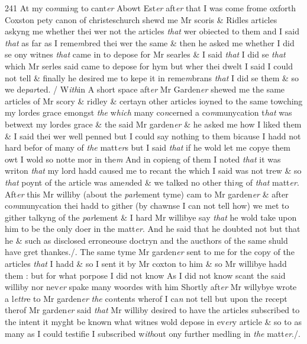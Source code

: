 \documentclass[12pt, a4paper]{book}
\begin{document}
{\color{Mahogany}241} At my co\textit{m}mi\textit{n}g to cant\textit{er}  Abowt Est\textit{er} aft\textit{er} that I was come frome oxforth Coxston pety canon of  christeschurch shewd me Mr scoris \& Ridles articles askyng me whether thei wer not the articles \textit{that} wer obiected to them and I said \textit{that} as  far as I reme\textit{m}bred thei wer the same \& then he asked me whether I did se ony witnes \textit{that} came in to depose for Mr searles \& I said \textit{that} I did se \textit{that} which Mr serles said came to depose for hym but  wher thei dwelt I said I could not tell \& finally he desired me to kepe it in reme\textit{m}brans \textit{that} I did se them \& so we de\textit{par}ted. /  W\textit{ith}in A short space aft\textit{er} Mr Garden\textit{er} shewed me the same articles of Mr scory \& ridley \& certayn other articles ioyned to the same towching my lordes grace emongst \textit{the} w\textit{hich} many co\textit{n}cerned a co\textit{m}munycation t\textit{hat}  was betwext my lordes grace \& the said Mr garden\textit{er} \& he asked me how I liked them \& I said thei wer well penned but I could say nothing to them bicause I hadd not hard befor of many of \textit{the} matt\textit{er}s but I said \textit{that} if he wold let me copye them owt I wold so notte mor in the\textit{m} And in copieng of them I noted \textit{that} it was writon \textit{that} my lord hadd caused me to recant the which I said was not trew \& so \textit{that} poynt of the article was ame\textit{n}ded \& we talked no other thi\textit{n}g of \textit{that} matt\textit{er}.  Aft\textit{er} this Mr williby (about the \textit{par}lement tyme) cam to Mr garden\textit{er} \& after co\textit{m}munycation thei hadd to gither (by chawnse I can not tell how) we met to gither talkyng of the \textit{par}lement \& I hard Mr willibye say \textit{that} he wold take upon him to be the only doer in the matt\textit{er}. And he said that  he doubted not but that he \& such as disclosed erroneouse doctryn and the aucthors of the same shuld have gret thankes./. The same tyme Mr garden\textit{er} sent to me for the copy of the articles \textit{that} I hadd \& so I sent it by Mr coxton to him \& so Mr willibye hadd them : but for what porpose I did not know As I did not know scant the said williby nor nev\textit{er} spake many woordes with him Shortly aft\textit{er} Mr willybye wrote a l\textit{ettr}e to Mr garden\textit{er}
               \textit{the} co\textit{n}tents wherof I ca\textit{n} not tell but upon the recept therof Mr garden\textit{er} said \textit{that} Mr williby desired to have the articles subscribed to the intent it myght be known what witnes wold depose in ev\textit{er}y article \& so to as many as I could testifie I subscribed w\textit{ith}out ony further medling in \textit{the} matt\textit{er}./.
\end{document}
